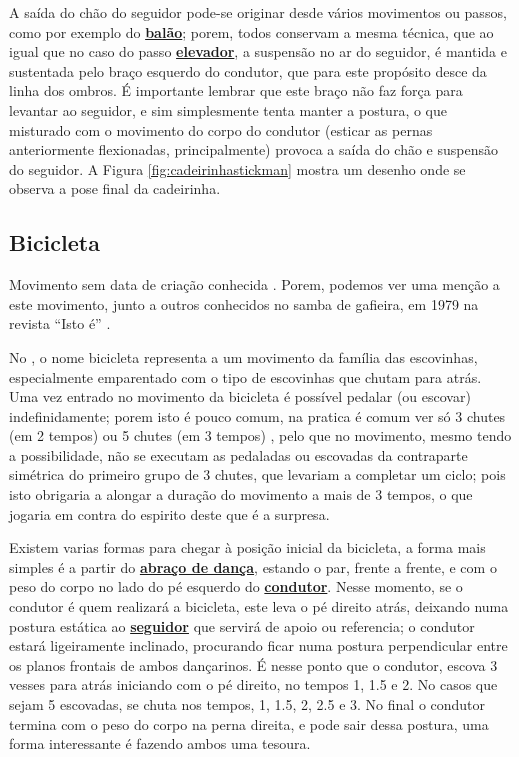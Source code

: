 A saída do chão do seguidor pode-se originar desde vários movimentos ou passos,
como por exemplo do  \hyperref[def:PassoBalao]{\textbf{balão}}; 
porem,
todos conservam a mesma técnica, que ao igual que  no caso do passo  \hyperref[def:PassoElevador]{\textbf{elevador}},
a suspensão no ar do seguidor, é mantida e sustentada pelo braço esquerdo do condutor,
que para este propósito  desce da linha dos ombros.
É importante lembrar que este braço não faz força para levantar ao seguidor, 
e sim simplesmente tenta manter a postura,
o que misturado com o movimento do corpo do condutor (esticar as pernas anteriormente flexionadas, principalmente)
provoca a saída do chão e suspensão do seguidor.
A Figura \ref{fig:cadeirinhastickman} mostra um desenho onde se observa a pose final da cadeirinha.


\subsection{Bicicleta}

Movimento sem data de criação conhecida \cite[pp. 143,144]{perna2002samba}.
Porem, podemos ver uma menção a este movimento, junto a outros conhecidos no samba de gafieira, 
em 1979 na revista ``Isto é'' \cite[pp. 89]{revista1979isto}.

No \AnoLivro, o nome bicicleta representa a um movimento da família das escovinhas,
especialmente emparentado com o tipo de escovinhas que chutam para atrás.
Uma vez entrado no movimento da bicicleta é possível pedalar (ou escovar) indefinidamente;
porem isto é pouco comum, na pratica é comum ver só 3 chutes (em 2 tempos) ou 5 chutes (em 3 tempos) ,
pelo que no movimento, mesmo tendo a possibilidade, 
não se executam as pedaladas ou escovadas da contraparte simétrica do primeiro grupo de 3 chutes,
que levariam a completar um ciclo;
pois isto obrigaria a alongar a duração do movimento a mais de 3 tempos,
o que jogaria em contra do espirito deste que é a surpresa.

Existem varias formas para chegar à posição inicial da bicicleta,  
a forma mais simples é a partir do \hyperref[def:abracodedanca]{\textbf{abraço de dança}},
estando o par, frente a frente, 
e com o peso do corpo no lado do pé esquerdo do \hyperref[def:Condutor]{\textbf{condutor}}.
Nesse momento, se o condutor é quem realizará a bicicleta, 
este leva o pé direito atrás,
deixando numa postura estática ao \hyperref[def:Seguidor]{\textbf{seguidor}} 
que servirá de apoio ou referencia;   
o condutor estará ligeiramente inclinado,
procurando ficar numa postura perpendicular entre os planos frontais de ambos dançarinos.
É nesse ponto que o condutor, escova 3 vesses para atrás iniciando com o pé direito,
no tempos 1, 1.5 e 2. No casos que sejam 5 escovadas, se chuta nos tempos,
1, 1.5, 2, 2.5 e 3. No final o condutor termina com o peso do corpo na perna direita,
e pode sair dessa postura, uma forma interessante é fazendo ambos uma tesoura.

